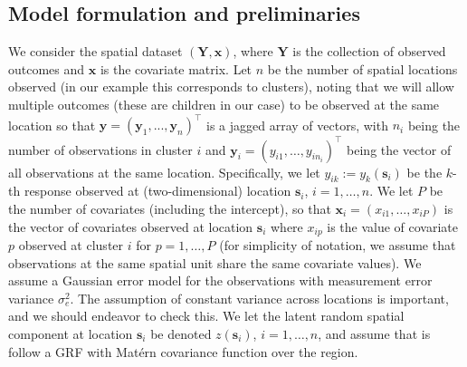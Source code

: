 \documentclass[preprint,12pt,authoryear]{elsarticle}
\begin{document}
\subsection{Model formulation and preliminaries}
\label{sec:LGM}

We consider the spatial dataset $(\mathbf{Y}, \boldsymbol{x})$, where $\mathbf{Y}$ is the collection of observed outcomes and $\boldsymbol{x}$ is the covariate matrix. Let $n$ be the number of spatial locations observed (in our example this corresponds to clusters), noting that we will allow multiple outcomes (these are children in our case) to be observed at the same location so that $\boldsymbol{y} = \left(\boldsymbol{y}_1, ..., \boldsymbol{y}_n\right)^\intercal$ is a jagged array of vectors, with $n_i$ being the number of observations in cluster $i$ and $\boldsymbol{y}_i = \left(y_{i1}, \dots, y_{in_i}\right)^\intercal$ being the vector of all observations at the same location. Specifically, we let $y_{ik}:=y_{k}(\boldsymbol{s}_i)$ be the $k$-th response observed at (two-dimensional) location $\boldsymbol{s}_i$, $i = 1, \dots, n$. We let $P$ be the number of covariates (including the intercept), so that $\boldsymbol{x}_i = (x_{i1}, \dots, x_{iP})$ is the vector of covariates observed at location $\boldsymbol{s}_i$ where $x_{ip}$ is the value of covariate $p$ observed at cluster $i$ for $p = 1, \dots, P$ (for simplicity of notation, we assume that observations at the same spatial unit share the same covariate values). We assume a Gaussian error model for the observations with measurement error  variance $\sigma_e^2$. The assumption of constant variance across locations is important, and we should endeavor to check this. We let the latent random spatial component at location $\boldsymbol{s}_i$ be denoted ${z}(\boldsymbol{s}_i)$, $i=1,\dots,n$, and assume that is follow a GRF with Mat\'ern covariance function over the region. 
\end{document}
